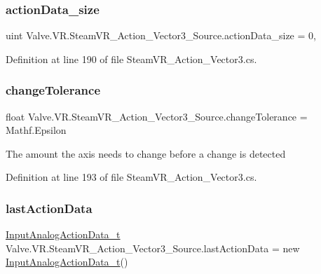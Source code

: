 \subsubsection{\texorpdfstring{actionData\_size}{actionData\_size}}
{\footnotesize\ttfamily uint Valve.\+V\+R.\+Steam\+V\+R\+\_\+\+Action\+\_\+\+Vector3\+\_\+\+Source.\+action\+Data\+\_\+size = 0\hspace{0.3cm}{\ttfamily [static]}, {\ttfamily [protected]}}



Definition at line 190 of file Steam\+V\+R\+\_\+\+Action\+\_\+\+Vector3.\+cs.

\mbox{\label{class_valve_1_1_v_r_1_1_steam_v_r___action___vector3___source_ac807acb257c84cf4744c3ba22e9b9bb1}} 
\subsubsection{\texorpdfstring{changeTolerance}{changeTolerance}}
{\footnotesize\ttfamily float Valve.\+V\+R.\+Steam\+V\+R\+\_\+\+Action\+\_\+\+Vector3\+\_\+\+Source.\+change\+Tolerance = Mathf.\+Epsilon}



The amount the axis needs to change before a change is detected 



Definition at line 193 of file Steam\+V\+R\+\_\+\+Action\+\_\+\+Vector3.\+cs.

\mbox{\label{class_valve_1_1_v_r_1_1_steam_v_r___action___vector3___source_af27018c0c1e75a7f749be6fb92172aa3}} 
\subsubsection{\texorpdfstring{lastActionData}{lastActionData}}
{\footnotesize\ttfamily \mbox{\hyperlink{struct_valve_1_1_v_r_1_1_input_analog_action_data__t}{Input\+Analog\+Action\+Data\+\_\+t}} Valve.\+V\+R.\+Steam\+V\+R\+\_\+\+Action\+\_\+\+Vector3\+\_\+\+Source.\+last\+Action\+Data = new \mbox{\hyperlink{struct_valve_1_1_v_r_1_1_input_analog_action_data__t}{Input\+Analog\+Action\+Data\+\_\+t}}()\hspace{0.3cm}{\ttfamily [protected]}}



